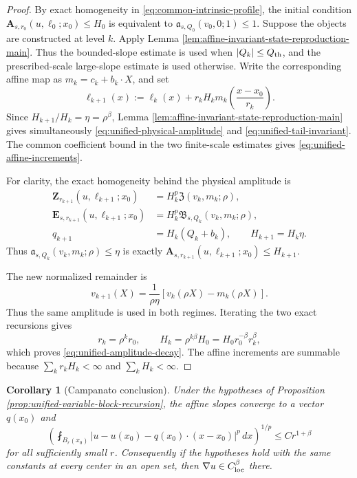 \documentclass[11pt,reqno]{amsart}
\numberwithin{equation}{section}
\newcommand{\dd}{\,d}
\newtheorem{corollary}[theorem]{Corollary}
\theoremstyle{remark}
\begin{document}
\begin{proof}
By exact homogeneity in \eqref{eq:common-intrinsic-profile}, the initial
condition \(\mathbf A_{s,r_0}(u,\ell_0;x_0)\le H_0\) is equivalent to
\(\mathfrak a_{s,Q_0}(v_0,0;1)\le1\).
Suppose the objects are constructed at level \(k\).  Apply Lemma
\ref{lem:affine-invariant-state-reproduction-main}.  Thus the
bounded-slope estimate is used when \(|Q_k|\le Q_{\rm th}\), and the
prescribed-scale large-slope estimate is used otherwise.  Write the
corresponding affine map as \(m_k=c_k+b_k\cdot X\), and set
\begin{equation*}
 \ell_{k+1}(x):=\ell_k(x)+r_kH_k
 m_k\left(\frac{x-x_0}{r_k}\right).
\end{equation*}
Since \(H_{k+1}/H_k=\eta=\rho^\beta\), Lemma
\ref{lem:affine-invariant-state-reproduction-main} gives simultaneously
\eqref{eq:unified-physical-amplitude} and
\eqref{eq:unified-tail-invariant}.  The common coefficient bound in the
two finite-scale estimates gives
\eqref{eq:unified-affine-increments}.

For clarity, the exact homogeneity behind the physical amplitude is
\begin{align*}
 \mathbf Z_{r_{k+1}}(u,\ell_{k+1};x_0)
 &=H_k^p\mathfrak Z(v_k,m_k;\rho),\\
 \mathbf E_{s,r_{k+1}}(u,\ell_{k+1};x_0)
 &=H_k^p\mathfrak B_{s,Q_k}(v_k,m_k;\rho),\\
 q_{k+1}&=H_k(Q_k+b_k),\qquad
 H_{k+1}=H_k\eta .
\end{align*}
Thus
\(\mathfrak a_{s,Q_k}(v_k,m_k;\rho)\le\eta\) is exactly
\(\mathbf A_{s,r_{k+1}}(u,\ell_{k+1};x_0)\le H_{k+1}\).

The new normalized remainder is
\begin{equation*}
 v_{k+1}(X)=\frac{1}{\rho\eta}
 [v_k(\rho X)-m_k(\rho X)].
\end{equation*}
Thus the same amplitude is used in both regimes.  Iterating the two
exact recursions gives
\[
 r_k=\rho^kr_0,\qquad H_k=\rho^{k\beta}H_0
      =H_0r_0^{-\beta}r_k^\beta,
\]
which proves \eqref{eq:unified-amplitude-decay}.  The affine increments
are summable because \(\sum_k r_kH_k<\infty\) and
\(\sum_kH_k<\infty\).
\end{proof}
\begin{corollary}[Campanato conclusion]
\label{cor:common-recursion-campanato}
Under the hypotheses of Proposition
\ref{prop:unified-variable-block-recursion}, the affine slopes converge
to a vector $q(x_0)$ and
\begin{equation}
 \left(\fint_{B_r(x_0)}
 |u-u(x_0)-q(x_0)\cdot(x-x_0)|^p\dd x\right)^{1/p}
 \le Cr^{1+\beta}
 \label{eq:common-recursion-campanato-decay}
\end{equation}
for all sufficiently small $r$.  Consequently
if the hypotheses hold with the same constants at every center in an
open set, then \(\nabla u\in C^{\beta}_{\rm loc}\) there.
\end{corollary}
\end{document}
